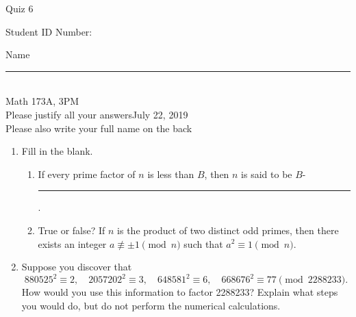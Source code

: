 \documentclass[12pt]{article}
\begin{document}
\begin{flushleft} 
\centerline{\LARGE{Quiz 6}} 
\vspace{5 mm}
{Student ID Number:}\hfill  
{Name \rule {2 in}{0.01in}}\\
Math 173A, 3PM
\\
{Please justify all your answers}\hfill {July 22, 2019}
\\
{Please also write your full name on the back} 

\medskip
\end{flushleft}

\begin{enumerate}
	\item Fill in the blank.\begin{enumerate}
		\item If every prime factor of $n$ is less than $B$, then $n$ is said to be $B$-\rule{3.5cm}{.15mm}.
		\item True or false? If $n$ is the product of two distinct odd primes, then there exists an integer $a\not\equiv \pm 1 \pmod{n}$ such that $a^2 \equiv 1 \pmod{n}$.
	\end{enumerate}
	\item Suppose you discover that
	\[
	880525^2 \equiv 2,\quad 2057202^2 \equiv 3,\quad 648581^2\equiv 6,\quad 668676^2\equiv 77 \pmod 2288233.
	\]
	How would you use this information to factor 2288233? Explain what steps you would do, but do not perform the numerical calculations.
	\vfill
\end{enumerate}

\end{document}
